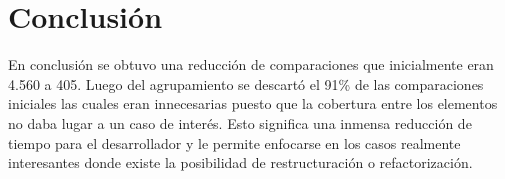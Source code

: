 \section{Conclusión}

\par En conclusión se obtuvo una reducción de comparaciones que inicialmente eran 4.560 a 405. Luego del agrupamiento se descartó el 91\% de las comparaciones iniciales las cuales eran innecesarias puesto que la cobertura entre los elementos no daba lugar a un caso de interés. Esto significa una inmensa reducción de tiempo para el desarrollador y le permite enfocarse en los casos realmente interesantes donde existe la posibilidad de restructuración o refactorización. 




